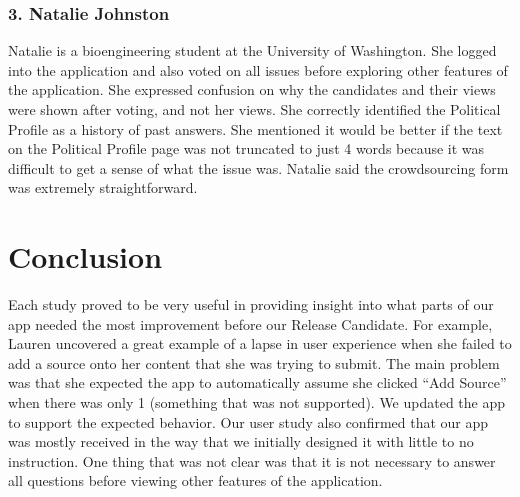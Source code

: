 \documentclass[11pt]{article}
\begin{document}
\subsubsection{3. Natalie Johnston}

Natalie is a bioengineering student at the University of Washington. She logged into the application and also voted on all issues before exploring other features of the application. She expressed confusion on why the candidates and their views were shown after voting, and not her views. She correctly identified the Political Profile as a history of past answers. She mentioned it would be better if the text on the Political Profile page was not truncated to just 4 words because it was difficult to get a sense of what the issue was. Natalie said the crowdsourcing form was extremely straightforward.

\section*{Conclusion}

Each study proved to be very useful in providing insight into what parts of our app needed the most improvement before our Release Candidate. For example, Lauren uncovered a great example of a lapse in user experience when she failed to add a source onto her content that she was trying to submit. The main problem was that she expected the app to automatically assume she clicked ``Add Source'' when there was only 1 (something that was not supported). We updated the app to support the expected behavior. Our user study also confirmed that our app was mostly received in the way that we initially designed it with little to no instruction. One thing that was not clear was that it is not necessary to answer all questions before viewing other features of the application.\\[-9pt]
\end{document}
